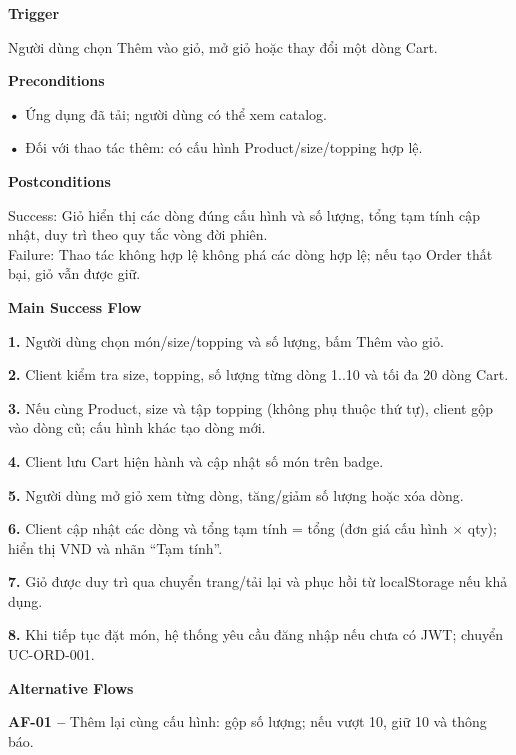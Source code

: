 \documentclass[11pt,a4paper,oneside]{report}
\begin{document}
\par\smallskip\noindent\textcolor{sgublue}{\textbf{Trigger}}\par\nobreak
Người dùng chọn Thêm vào giỏ, mở giỏ hoặc thay đổi một dòng Cart.
\par

\par\smallskip\noindent\textcolor{sgublue}{\textbf{Preconditions}}\par\nobreak
\textbf{•} Ứng dụng đã tải; người dùng có thể xem catalog.

\textbf{•} Đối với thao tác thêm: có cấu hình Product/size/topping hợp lệ.
\par

\par\smallskip\noindent\textcolor{sgublue}{\textbf{Postconditions}}\par\nobreak
Success: Giỏ hiển thị các dòng đúng cấu hình và số lượng, tổng tạm tính cập nhật, duy trì theo quy tắc vòng đời phiên.\\
Failure: Thao tác không hợp lệ không phá các dòng hợp lệ; nếu tạo Order thất bại, giỏ vẫn được giữ.\strut
\par

\par\smallskip\noindent\textcolor{sgublue}{\textbf{Main Success Flow}}\par\nobreak
\textbf{1.} Người dùng chọn món/size/topping và số lượng, bấm Thêm vào giỏ.

\textbf{2.} Client kiểm tra size, topping, số lượng từng dòng 1..10 và tối đa 20 dòng Cart.

\textbf{3.} Nếu cùng Product, size và tập topping (không phụ thuộc thứ tự), client gộp vào dòng cũ; cấu hình khác tạo dòng mới.

\textbf{4.} Client lưu Cart hiện hành và cập nhật số món trên badge.

\textbf{5.} Người dùng mở giỏ xem từng dòng, tăng/giảm số lượng hoặc xóa dòng.

\textbf{6.} Client cập nhật các dòng và tổng tạm tính = tổng (đơn giá cấu hình × qty); hiển thị VND và nhãn ``Tạm tính''.

\textbf{7.} Giỏ được duy trì qua chuyển trang/tải lại và phục hồi từ localStorage nếu khả dụng.

\textbf{8.} Khi tiếp tục đặt món, hệ thống yêu cầu đăng nhập nếu chưa có JWT; chuyển UC-ORD-001.
\par

\par\smallskip\noindent\textcolor{sgublue}{\textbf{Alternative Flows}}\par\nobreak
\textbf{AF-01 --} Thêm lại cùng cấu hình: gộp số lượng; nếu vượt 10, giữ 10 và thông báo.
\end{document}
